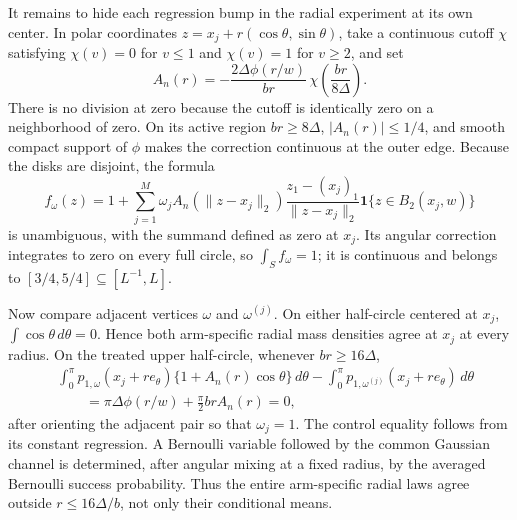 It remains to hide each regression bump in the radial experiment at its own center.  In polar coordinates \(z=x_j+r(\cos\theta,\sin\theta)\), take a continuous cutoff \(\chi\) satisfying \(\chi(v)=0\) for \(v\leq1\) and \(\chi(v)=1\) for \(v\geq2\), and set
\[
A_n(r)=-\frac{2\Delta\phi(r/w)}{br}\,
\chi\!\left(\frac{br}{8\Delta}\right).
\]
There is no division at zero because the cutoff is identically zero on a neighborhood of zero.  On its active region \(br\geq8\Delta\), \(\lvert A_n(r)\rvert\leq1/4\), and smooth compact support of \(\phi\) makes the correction continuous at the outer edge.  Because the disks are disjoint, the formula
\[
f_\omega(z)=1+\sum_{j=1}^M\omega_jA_n(\lVert z-x_j\rVert_2)
\frac{z_1-(x_j)_1}{\lVert z-x_j\rVert_2}
\mathbf 1\{z\in B_2(x_j,w)\}
\]
is unambiguous, with the summand defined as zero at \(x_j\).  Its angular correction integrates to zero on every full circle, so \(\int_Sf_\omega=1\); it is continuous and belongs to \([3/4,5/4]\subseteq[L^{-1},L]\).

Now compare adjacent vertices \(\omega\) and \(\omega^{(j)}\).  On either half-circle centered at \(x_j\), \(\int\cos\theta\,d\theta=0\).  Hence both arm-specific radial mass densities agree at \(x_j\) at every radius.  On the treated upper half-circle, whenever \(br\geq16\Delta\),
\[
\begin{aligned}
&\int_0^\pi p_{1,\omega}(x_j+r e_\theta)\{1+A_n(r)\cos\theta\}\,d\theta
-\int_0^\pi p_{1,\omega^{(j)}}(x_j+r e_\theta)\,d\theta\\
&\qquad=\pi\Delta\phi(r/w)+\frac\pi2brA_n(r)=0,
\end{aligned}
\]
after orienting the adjacent pair so that \(\omega_j=1\).  The control equality follows from its constant regression.  A Bernoulli variable followed by the common Gaussian channel is determined, after angular mixing at a fixed radius, by the averaged Bernoulli success probability.  Thus the entire arm-specific radial laws agree outside \(r\leq16\Delta/b\), not only their conditional means.

